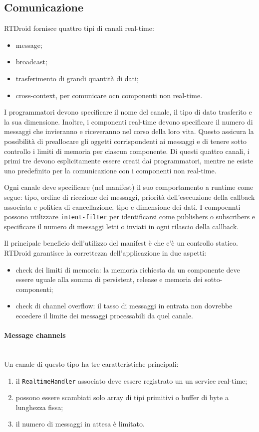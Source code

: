 \subsection{Comunicazione}
RTDroid fornisce quattro tipi di canali real-time:
\begin{itemize}
	\item message;
	\item broadcast;
	\item trasferimento di grandi quantità di dati;
	\item cross-context, per comunicare ocn componenti non real-time.
\end{itemize}
I programmatori devono specificare il nome del canale, il tipo di dato trasferito e la sua dimensione. Inoltre, i componenti real-time devono specificare il numero di messaggi che invieranno e riceveranno nel corso della loro vita. Questo assicura la possibilità di preallocare gli oggetti corrispondenti ai messaggi e di tenere sotto controllo i limiti di memoria per ciascun componente. Di questi quattro canali, i primi tre devono esplicitamente essere creati dai programmatori, mentre ne esiste uno predefinito per la comunicazione con i componenti non real-time.

Ogni canale deve specificare (nel manifest) il suo comportamento a runtime come segue: tipo, ordine di ricezione dei messaggi, priorità dell'esecuzione della callback associata e politica di cancellazione, tipo e dimensione dei dati. I compoennti possono utilizzare \texttt{intent-filter} per identificarsi come publishers o subscribers e specificare il numero di messaggi letti o inviati in ogni rilascio della callback. 

Il principale beneficio dell'utilizzo del manifest è che c'è un controllo statico. RTDroid garantisce la correttezza dell'applicazione in due aspetti:
\begin{itemize}
	\item check dei limiti di memoria: la memoria richiesta da un componente deve essere uguale alla somma di persistent, release e memoria dei sotto-componenti;
	\item check di channel overflow: il tasso di messaggi in entrata non dovrebbe eccedere il limite dei messaggi processabili da quel canale.
\end{itemize}

\paragraph{Message channels} \mbox{} \\
Un canale di questo tipo ha tre caratteristiche principali:
\begin{enumerate}
	\item il \texttt{RealtimeHandler} associato deve essere registrato un un service real-time;
	\item possono essere scambiati solo array di tipi primitivi o buffer di byte a lunghezza fissa;
	\item il numero di messaggi in attesa è limitato.
\end{enumerate}


